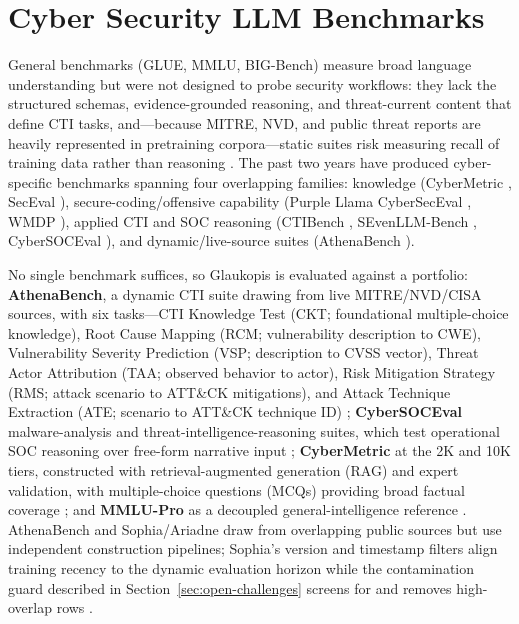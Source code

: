 \documentclass[conference]{IEEEtran}
\begin{document}
\section{Cyber Security LLM Benchmarks}
\label{sec:benchmarks}

General benchmarks (GLUE, MMLU, BIG-Bench) measure broad language understanding but were not designed to probe security workflows: they lack the structured schemas, evidence-grounded reasoning, and threat-current content that define CTI tasks, and---because MITRE, NVD, and public threat reports are heavily represented in pretraining corpora---static suites risk measuring recall of training data rather than reasoning \cite{alam2025athenabench}. The past two years have produced cyber-specific benchmarks spanning four overlapping families: knowledge (CyberMetric \cite{tihanyi2024cybermetric}, SecEval \cite{hu2024seceval}), secure-coding/offensive capability (Purple Llama CyberSecEval \cite{bhatt2023purplellama,bhatt2024cyberseceval2}, WMDP \cite{li2024wmdp}), applied CTI and SOC reasoning (CTIBench \cite{alam2024ctibench}, SEvenLLM-Bench \cite{ji2024sevenllm}, CyberSOCEval \cite{cybersoceval2025}), and dynamic/live-source suites (AthenaBench \cite{alam2025athenabench}).

No single benchmark suffices, so Glaukopis is evaluated against a portfolio: \textbf{AthenaBench}, a dynamic CTI suite drawing from live MITRE/NVD/CISA sources, with six tasks---CTI Knowledge Test (CKT; foundational multiple-choice knowledge), Root Cause Mapping (RCM; vulnerability description to CWE), Vulnerability Severity Prediction (VSP; description to CVSS vector), Threat Actor Attribution (TAA; observed behavior to actor), Risk Mitigation Strategy (RMS; attack scenario to ATT\&CK mitigations), and Attack Technique Extraction (ATE; scenario to ATT\&CK technique ID) \cite{alam2025athenabench}; \textbf{CyberSOCEval} malware-analysis and threat-intelligence-reasoning suites, which test operational SOC reasoning over free-form narrative input \cite{cybersoceval2025}; \textbf{CyberMetric} at the 2K and 10K tiers, constructed with retrieval-augmented generation (RAG) and expert validation, with multiple-choice questions (MCQs) providing broad factual coverage \cite{tihanyi2024cybermetric}; and \textbf{MMLU-Pro} as a decoupled general-intelligence reference \cite{wang2024mmlupro}. AthenaBench and Sophia/Ariadne draw from overlapping public sources but use independent construction pipelines; Sophia's version and timestamp filters align training recency to the dynamic evaluation horizon while the contamination guard described in Section~\ref{sec:open-challenges} screens for and removes high-overlap rows \cite{cardei2025ift,alam2025athenabench}.
\end{document}
